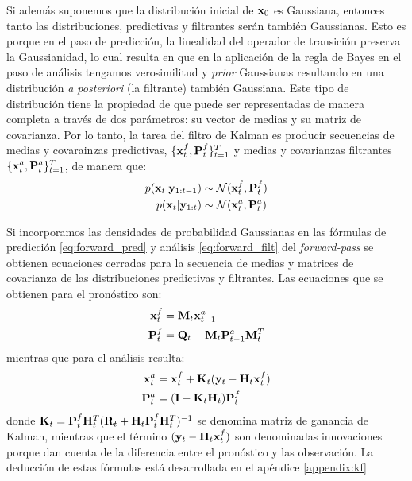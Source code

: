 Si además suponemos que la distribución inicial de $\mathbf{x}_0$ es Gaussiana, entonces tanto las distribuciones, predictivas y filtrantes serán también Gaussianas. Esto es porque en el paso de predicción, la linealidad del operador de transición preserva la Gaussianidad, lo cual resulta en que en la aplicación de la regla de Bayes en el paso de análisis tengamos verosimilitud y \textit{prior} Gaussianas resultando en una distribución \textit{a posteriori} (la filtrante) también Gaussiana. Este tipo de distribución tiene la propiedad de que puede ser representadas de manera completa a través de dos parámetros: su vector de medias y su matriz de covarianza. Por lo tanto, la tarea del filtro de Kalman es producir secuencias de medias y covarainzas predictivas, $\{\mathbf{x}_t^f, \mathbf{P}_t^f\}_{t=1}^{T}$ y medias y covarianzas filtrantes $\{\mathbf{x}_t^a, \mathbf{P}_t^a\}_{t=1}^{T}$, de manera que:
\begin{align*}
    p(\mathbf{x}_t | \mathbf{y}_{1:t-1}) &\sim \mathcal{N}(\mathbf{x}_t^f, \mathbf{P}_t^f) \\
    p(\mathbf{x}_t | \mathbf{y}_{1:t}) &\sim \mathcal{N}(\mathbf{x}_t^a, \mathbf{P}_t^a)
\end{align*}

Si incorporamos las densidades de probabilidad Gaussianas en las fórmulas de predicción \ref{eq:forward_pred} y análisis \ref{eq:forward_filt} del \textit{forward-pass} se obtienen ecuaciones cerradas para la secuencia de medias y matrices de covarianza de las distribuciones predictivas y filtrantes. Las ecuaciones que se obtienen para el pronóstico son:
\begin{align}
    \mathbf{x}_t^f &= \mathbf{M}_t \mathbf{x}_{t-1}^a \label{eq:kf_mean_pred}\\ 
    \mathbf{P}_t^f &= \mathbf{Q}_t + \mathbf{M}_t \mathbf{P}_{t-1}^a \mathbf{M}_t^T \label{eq:kf_var_pred}
\end{align}
mientras que para el análisis resulta:
\begin{align}
    \mathbf{x}_t^a &= \mathbf{x}_t^f + \mathbf{K}_t (\mathbf{y}_t - \mathbf{H}_t \mathbf{x}_t^f) \label{eq:kf_mean_filter} \\ 
    \mathbf{P}_t^a &= (\mathbf{I} - \mathbf{K}_t \mathbf{H}_t) \mathbf{P}_t^f \label{eq:kf_var_filter}
\end{align}
donde $\mathbf{K}_t = \mathbf{P}_t^f \mathbf{H}_t^T(\mathbf{R}_t + \mathbf{H}_t \mathbf{P}_t^f \mathbf{H}_t^T)^{-1}$ se denomina matriz de ganancia de Kalman, mientras que el término $(\mathbf{y}_t - \mathbf{H}_t \mathbf{x}_t^f)$ son denominadas innovaciones porque dan cuenta de la diferencia entre el pronóstico y las observación. La deducción de estas fórmulas está desarrollada en el apéndice \ref{appendix:kf}

